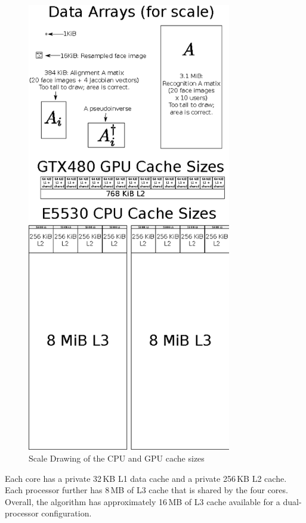 \documentclass[10pt,twocolumn,letterpaper]{article}
\begin{document}
\begin{figure}
\begin{center}
\includegraphics[width=3.5in]{figures/caches}
\end{center}
\caption{Scale Drawing of the CPU and GPU cache sizes}
\label{fig:caches}
\end{figure}

Each core has a private 32\,KB L1 data cache and a private 256\,KB L2 cache.
Each processor further has 8\,MB of L3 cache that is shared by the four cores.
Overall, the algorithm has approximately 16\,MB of L3 cache
available for a dual-processor configuration.  
\end{document}
